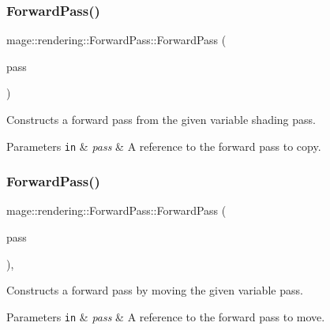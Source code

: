 \subsubsection{\texorpdfstring{Forward\+Pass()}{ForwardPass()}\hspace{0.1cm}{\footnotesize\ttfamily [2/3]}}
{\footnotesize\ttfamily mage\+::rendering\+::\+Forward\+Pass\+::\+Forward\+Pass (\begin{DoxyParamCaption}\item[{const \hyperlink{classmage_1_1rendering_1_1_forward_pass}{Forward\+Pass} \&}]{pass }\end{DoxyParamCaption})\hspace{0.3cm}{\ttfamily [delete]}}

Constructs a forward pass from the given variable shading pass.


\begin{DoxyParams}[1]{Parameters}
\mbox{\tt in}  & {\em pass} & A reference to the forward pass to copy. \\
\hline
\end{DoxyParams}
\hypertarget{classmage_1_1rendering_1_1_forward_pass_a5f7026d7b4a439bdbacfeaf8fff152c1}{}\label{classmage_1_1rendering_1_1_forward_pass_a5f7026d7b4a439bdbacfeaf8fff152c1} 
\subsubsection{\texorpdfstring{Forward\+Pass()}{ForwardPass()}\hspace{0.1cm}{\footnotesize\ttfamily [3/3]}}
{\footnotesize\ttfamily mage\+::rendering\+::\+Forward\+Pass\+::\+Forward\+Pass (\begin{DoxyParamCaption}\item[{\hyperlink{classmage_1_1rendering_1_1_forward_pass}{Forward\+Pass} \&\&}]{pass }\end{DoxyParamCaption})\hspace{0.3cm}{\ttfamily [default]}, {\ttfamily [noexcept]}}

Constructs a forward pass by moving the given variable pass.


\begin{DoxyParams}[1]{Parameters}
\mbox{\tt in}  & {\em pass} & A reference to the forward pass to move. \\
\hline
\end{DoxyParams}
\hypertarget{classmage_1_1rendering_1_1_forward_pass_a9fdcc7dca5097f0feff2f7be92a2727c}{}\label{classmage_1_1rendering_1_1_forward_pass_a9fdcc7dca5097f0feff2f7be92a2727c} 
